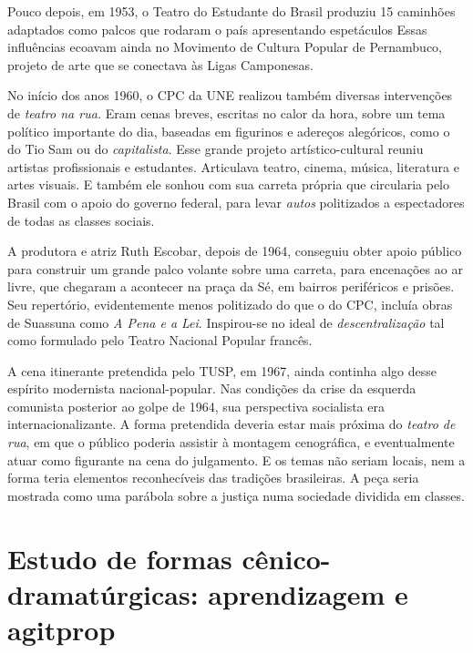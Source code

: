 Pouco depois, em 1953, o Teatro do Estudante do Brasil produziu 15
caminhões adaptados como palcos que rodaram o país apresentando
espetáculos Essas influências ecoavam ainda no Movimento de Cultura
Popular de Pernambuco, projeto de arte que se conectava às Ligas
Camponesas.

No início dos anos 1960, o CPC da UNE realizou também diversas
intervenções de \textit{teatro na rua.} Eram cenas breves, escritas no
calor da hora, sobre um tema político importante do dia, baseadas em
figurinos e adereços alegóricos, como o do Tio Sam ou do
\textit{capitalista}. Esse grande projeto artístico-cultural reuniu
artistas profissionais e estudantes. Articulava teatro, cinema, música,
literatura e artes visuais. E também ele sonhou com sua carreta própria
que circularia pelo Brasil com o apoio do governo federal, para levar
\textit{autos} politizados a espectadores de todas as classes sociais.

A produtora e atriz Ruth Escobar, depois de 1964, conseguiu obter apoio
público para construir um grande palco volante sobre uma carreta, para
encenações ao ar livre, que chegaram a acontecer na praça da Sé, em
bairros periféricos e prisões. Seu repertório, evidentemente menos
politizado do que o do CPC, incluía obras de Suassuna como \textit{A Pena e
a Lei}. Inspirou-se no ideal de \textit{descentralização} tal como
formulado pelo Teatro Nacional Popular francês.

A cena itinerante pretendida pelo TUSP, em 1967, ainda continha algo
desse espírito modernista nacional-popular. Nas condições da crise da
esquerda comunista posterior ao golpe de 1964, sua perspectiva
socialista era internacionalizante. A forma pretendida deveria estar
mais próxima do \textit{teatro de rua}, em que o público poderia assistir à
montagem cenográfica, e eventualmente atuar como figurante na cena do
julgamento. E os temas não seriam locais, nem a forma teria elementos
reconhecíveis das tradições brasileiras. A peça seria mostrada como uma
parábola sobre a justiça numa sociedade dividida em classes.

\section{Estudo de formas cênico-dramatúrgicas: aprendizagem e agitprop}

